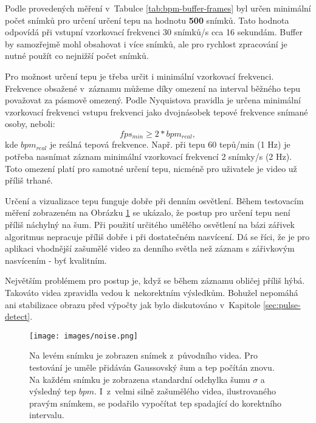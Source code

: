 \documentclass[
  digital, %
  table,   %
%
  lof,     %
  lot,     %
]{fithesis3}
\begin{document}
Podle provedených měření v~Tabulce \ref{tab:bpm-buffer-frames} byl určen minimální počet snímků pro určení určení tepu na hodnotu \textbf{500} snímků. Tato hodnota odpovídá při vstupní vzorkovací frekvenci 30 snímků/s cca 16 sekundám. Buffer by samozřejmě mohl obsahovat i více snímků, ale pro rychlost zpracování je nutné použít co nejnižší počet snímků.

Pro možnost určení tepu je třeba určit i minimální vzorkovací frekvenci. Frekvence obsažené v~záznamu můžeme díky omezení na interval běžného tepu považovat za pásmově omezený. Podle \mbox{Nyquistova} pravidla je určena minimální vzorkovací frekvenci vstupu frekvenci jako dvojnásobek tepové frekvence snímané osoby, neboli:
\begin{equation}
fps_{min} \geq 2*bpm_{real},
\end{equation}
kde $bpm_{real}$ je reálná tepová frekvence. Např. při tepu 60 tepů/min (1 Hz) je potřeba nasnímat záznam minimální vzorkovací frekvencí 2 snímky/s (2 Hz). Toto omezení platí pro samotné určení tepu, nicméně pro uživatele je video už příliš trhané.

Určení a vizualizace tepu funguje dobře při denním osvětlení. Během testovacím měření zobrazeném na Obrázku \ref{fig:noise-test} se ukázalo, že postup pro určení tepu není příliš náchylný na šum. Při použití určitého umělého osvětlení na bázi zářivek algoritmus nepracuje příliš dobře i při dostatečném nasvícení. Dá se říci, že je pro aplikaci vhodnější zašumělé video za denního světla než záznam s zářivkovým nasvícením - byť kvalitním.

Největším problémem pro postup je, když se během záznamu obličej příliš hýbá. Takováto videa zpravidla vedou k~nekorektním výsledkům. Bohužel nepomáhá ani stabilizace obrazu před výpočty jak bylo diskutováno v~Kapitole \ref{sec:pulse-detect}.

\begin{figure}
  \begin{center}
    \texttt{[image: images/noise.png]}
  \end{center}
  \caption{Na levém snímku je zobrazen snímek z~původního videa. Pro testování je uměle přidáván Gaussovský šum a tep počítán znovu. Na každém snímku je zobrazena standardní odchylka šumu $\sigma$ a výsledný tep $bpm$. I~z~velmi silně zašumělého videa, ilustrovaného pravým snímkem, se podařilo vypočítat tep spadající do korektního intervalu.}
  \label{fig:noise-test}
\end{figure}
\end{document}
